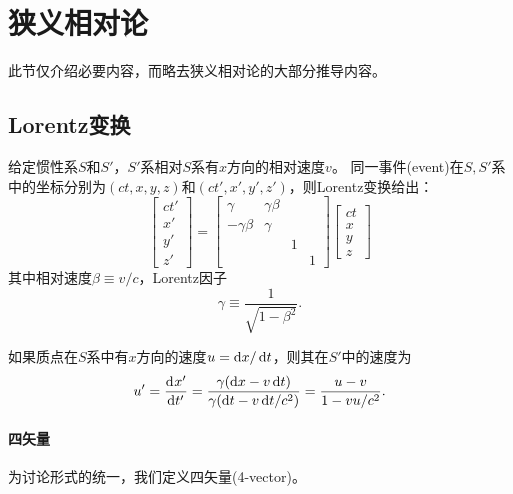 \section{狭义相对论}
此节仅介绍必要内容，而略去狭义相对论的大部分推导内容。%
\subsection{Lorentz变换}
给定惯性系$S$和$S'$，$S'$系相对$S$系有$x$方向的相对速度$v$。
同一事件(event)在$S,S'$系中的坐标分别为$(ct,x,y,z)$和$(ct',x',y',z')$，则Lorentz变换给出：
\begin{equation}
	\begin{bmatrix}
		ct'\\x'\\y'\\z'
	\end{bmatrix}=
	\begin{bmatrix}
		\gamma&\gamma\beta\\-\gamma\beta&\gamma\\ &&1\\ &&&1
	\end{bmatrix}
	\begin{bmatrix}
		ct\\x\\y\\z
	\end{bmatrix}
\end{equation}
其中相对速度$\beta\equiv v/c$，Lorentz因子
\[
    \gamma\equiv\frac1{\sqrt{1-\beta^2}}.
\]

如果质点在$S$系中有$x$方向的速度$u=\mathop{}\!\mathrm{d} x/\mathop{}\!\mathrm{d} t$，则其在$S'$中的速度为
\begin{equation}
    u'=\frac{\mathrm{d}^{{}}x'}{\mathrm{d}{t'}^{{}}}=\frac{\gamma(\mathop{}\!\mathrm{d} x-v\mathop{}\!\mathrm{d} t)}{\gamma(\mathop{}\!\mathrm{d} t-v\mathop{}\!\mathrm{d} t/c^2)}=\frac{u-v}{1-vu/c^2}.
\end{equation}

\paragraph{四矢量}

为讨论形式的统一，我们定义四矢量(4-vector)。

